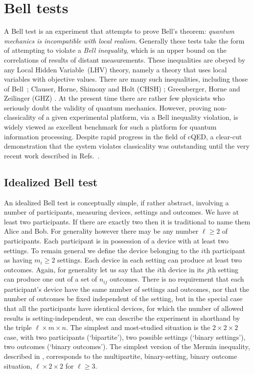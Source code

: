 \section{Bell tests}\label{sec:bell}
A Bell test is an experiment that attempts to prove Bell's theorem: \emph{quantum mechanics is incompatible with local realism}. Generally these tests take the form of attempting to violate a \emph{Bell inequality}, which is an upper bound on the correlations of results of distant measurements. These inequalities are obeyed by any Local Hidden Variable~(LHV) theory, namely a theory that uses local variables with objective values. There are many such inequalities, including those of Bell~\cite{bell_epr_1964}; Clauser, Horne, Shimony and Holt (CHSH) \cite{clauser_proposed_1969}; Greenberger, Horne and Zeilinger (GHZ) \cite{greenberger_going_1989}\@. At the present time there are rather few physicists who seriously doubt the validity of quantum mechanics. However, proving non-classicality of a given experimental platform, via a Bell inequality violation, is widely viewed as excellent benchmark for such a platform for quantum information processing. Despite rapid progress in the field of cQED, a clear-cut demonstration that the system violates classicality was outstanding until the very recent work described in Refs.~\cite{ansmann_thesis,ansmann_violation_2009}.

\subsection{Idealized Bell test}\label{sec:bellideal}
An idealized Bell test is conceptually simple, if rather abstract, involving a number of participants, measuring devices, settings and outcomes. We have at least two participants. If there are exactly two then it is traditional to name them Alice and Bob. For generality however there may be any number $\ell\ge2$ of participants. Each participant is in possession of a device with at least two settings. To remain general we define the device belonging to the $i$th participant as having $m_i\ge2$ settings. Each device in each setting can produce at least two outcomes. Again, for generality let us say that the $i$th device in its $j$th setting can produce one out of a set of $n_{ij}$ outcomes. There is no requirement that each participant's device have the same number of settings and outcomes, nor that the number of outcomes be fixed independent of the setting, but in the special case that all the participants have identical devices, for which the number of allowed results is setting-independent, we can describe the experiment in shorthand by the triple $\ell\times m\times n$. The simplest and most-studied situation is the $2\times2\times2$ case, with two participants (`bipartite'), two possible settings (`binary settings'), two outcomes (`binary outcomes'). The simplest version of the Mermin inequality, described in , corresponds to the multipartite, binary-setting, binary outcome situation,  $\ell\times2\times2$ for $\ell\ge3$.

